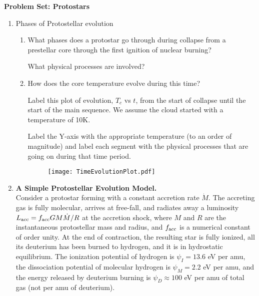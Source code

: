 \documentclass{article}
\begin{document}
\noindent\textbf{Problem Set: Protostars}


\begin{enumerate}


    \item Phases of Protostellar evolution

        \begin{enumerate}
            \item What phases does a protostar go through during collapse from a prestellar core through the first ignition of nuclear burning?

                What physical processes are involved?

            \item How does the core temperature evolve during this time?

                Label this
                plot of evolution, $T_c$ vs $t$, from the start of
                collapse until the start of the main sequence. We assume the
                cloud started with a temperature of 10K.

                Label the Y-axis with the appropriate temperature (to an order
                of magnitude) and label each segment with the physical
                processes that are going on during that time period.

                \begin{figure}[h!]
                \texttt{[image: TimeEvolutionPlot.pdf]}
                \end{figure}
                


        \end{enumerate}
\item {\bf A Simple Protostellar Evolution Model.}\\
Consider a protostar forming with a constant accretion rate $\dot{M}$. The
accreting gas is fully molecular, arrives at free-fall, and radiates away a
luminosity $L_{\rm acc} = f_{\rm acc} G M \dot{M}/R$ at the accretion shock,
where $M$ and $R$ are the instantaneous protostellar mass and radius, and
$f_{\rm acc}$ is a numerical constant of order unity. At the end of contraction,
the resulting star is fully ionized, all its deuterium has been burned to
hydrogen, and it is in hydrostatic equilibrium. The ionization potential of
hydrogen is $\psi_I = 13.6$ eV per amu, the dissociation potential of molecular
hydrogen is $\psi_M=2.2$ eV per amu, and the energy released by deuterium
burning is $\psi_D\approx 100$ eV per amu of total gas (not per amu of
deuterium).


\end{enumerate}
\end{document}

